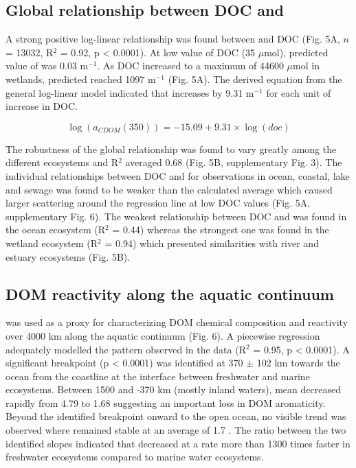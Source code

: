\subsection*{Global relationship between DOC and }

A strong positive log-linear relationship was found between  and DOC (Fig. 5A, $n$ = 13032, R$^2$ = 0.92, p < 0.0001). At low value of DOC (35 $\mu$mol), predicted value of  was 0.03 m$^{-1}$. As DOC increased to a maximum of 44600 $\mu$mol in wetlands, predicted  reached 1097 m$^{-1}$ (Fig. 5A). The derived equation from the general log-linear model indicated that  increases by 9.31 m$^{-1}$ for each unit of increase in DOC.

\begin{equation}
  \log(a_{CDOM}(350)) = -15.09 + 9.31 \times \log(doc)
\end{equation}

The robustness of the global relationship was found to vary greatly among the different ecosystems and R$^2$ averaged 0.68 (Fig. 5B, supplementary Fig. 3). The individual relationships between DOC and  for observations in ocean, coastal, lake and sewage was found to be weaker than the calculated average which caused larger scattering around the regression line at low DOC values (Fig. 5A, supplementary Fig. 6). The weakest relationship between DOC and  was found in the ocean ecosystem (R$^2$ = 0.44) whereas the strongest one was found in the wetland ecosystem (R$^2$ = 0.94) which presented similarities with river and estuary ecosystems (Fig. 5B).

\subsection*{DOM reactivity along the aquatic continuum}

 was used as a proxy for characterizing DOM chemical composition and reactivity \citep{Weishaar2003} over 4000 km along the aquatic continuum (Fig. 6). A piecewise regression adequately modelled the pattern observed in the data (R$^2$ = 0.95, p < 0.0001). A significant breakpoint (p < 0.0001) was identified at 370 $\pm$ 102 km towards the ocean from the coastline at the interface between freshwater and marine ecosystems. Between 1500 and -370 km (mostly inland waters), mean  decreased rapidly from 4.79 to 1.68 \suvagram suggesting an important loss in DOM aromaticity. Beyond the identified breakpoint onward to the open ocean, no visible trend was observed where  remained stable at an average of 1.7 \suvagram. The ratio between the two identified slopes indicated that  decreased at a rate more than 1300 times faster in freshwater ecosystems compared to marine water ecosystems.

